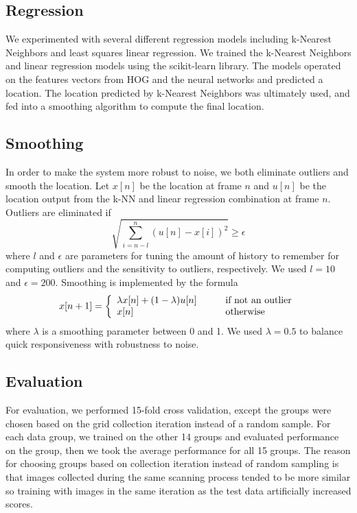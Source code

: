 \documentclass[10pt,twocolumn,letterpaper]{article}
\begin{document}
\subsection{Regression}
We experimented with several different regression models including k-Nearest Neighbors and least squares linear regression.  We trained the k-Nearest Neighbors and linear regression models using the scikit-learn library\cite{scikit-learn}.  The models operated on the features vectors from HOG and the neural networks and predicted a location. The location predicted by k-Nearest Neighbors was ultimately used, and fed into a smoothing algorithm to compute the final location.

\subsection{Smoothing}
In order to make the system more robust to noise, we both eliminate outliers and smooth the location. Let $x[n]$ be the location at frame $n$ and $u[n]$ be the location output from the k-NN and linear regression combination at frame $n$. Outliers are eliminated if
\begin{equation}
	\sqrt{\sum_{i=n-l}^{n}(u[n]-x[i])^2} \geq \epsilon
\end{equation}
where $l$ and $\epsilon$ are parameters for tuning the amount of history to remember for computing outliers and the sensitivity to outliers, respectively. We used $l=10$ and $\epsilon=200$. Smoothing is implemented by the formula 
\begin{equation}
	x[n+1] = \left\{
		\begin{array}{l l}
			\lambda x[n] + (1-\lambda)u[n] & \qquad \text{if not an outlier} \\
			x[n] & \qquad \text{otherwise}
		\end{array}
	\right.
\end{equation}
 where $\lambda$ is a smoothing parameter between 0 and 1. We used $\lambda=0.5$ to balance quick responsiveness with robustness to noise.
 
\subsection{Evaluation}
For evaluation, we performed 15-fold cross validation, except the groups were chosen based on the grid collection iteration instead of a random sample.  For each data group, we trained on the other 14 groups and evaluated performance on the group, then we took the average performance for all 15 groups.  The reason for choosing groups based on collection iteration instead of random sampling is that images collected during the same scanning process tended to be more similar so training with images in the same iteration as the test data artificially increased scores.
\end{document}
